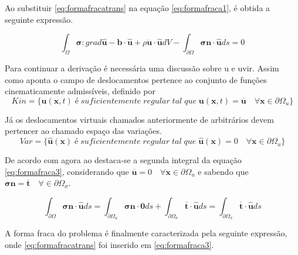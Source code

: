 Ao substituir \ref{eq:formafracatrans} na equação \ref{eq:formafraca1}, é obtida a seguinte expressão.

\begin{equation}
\int_{\Omega} \boldsymbol{\sigma} : grad \boldsymbol{\hat{u}} -  \boldsymbol{b} \cdot \boldsymbol{\hat{u}} + \rho\ddot{\boldsymbol{u}} \cdot \boldsymbol{\hat{u}} dV - \int_{\partial \Omega} \boldsymbol{\sigma n} \cdot \boldsymbol{\hat{u}} ds = 0
\label{eq:formafraca3}
\end{equation}

Para continuar a derivação é necessária uma discussão sobre \gls{u} e \gls{uvir}.  Assim como aponta \cite{Paulo} o campo de deslocamentos pertence ao conjunto de funções cinematicamente admissíveis, definido por 
\begin{equation}
	Kin = \{ \boldsymbol{u}(\boldsymbol{x},t) \; é \; suficientemente \; regular \; tal \; que \; \boldsymbol{u}(\boldsymbol{x},t) = \boldsymbol{\overline{u}}  \quad \forall \boldsymbol{x} \in \partial \Omega_u \}
\end{equation}

Já os deslocamentos virtuais chamados anteriormente de arbitrários devem pertencer ao chamado espaço das variações.
\begin{equation}
	Var  = \{ \boldsymbol{\hat{u}}(\boldsymbol{x}) \; é \; suficientemente \; regular \; tal \; que \; \boldsymbol{\hat{u}}(\boldsymbol{x}) = 0  \quad \forall \boldsymbol{x} \in \partial \Omega_u \}
\end{equation}


De acordo com \cite{Paulo} agora ao destaca-se a segunda integral da equação \ref{eq:formafraca3}, considerando que $ \boldsymbol{\overline{u}} = 0 \quad \forall \boldsymbol{x} \in \partial \Omega_u $ e sabendo que $ \boldsymbol{\sigma n} = \boldsymbol{\overline{t}} \quad \forall \in \partial \Omega_{\sigma} $.

\begin{equation} \label{eq:formafracatrans}
	\int_{\partial \Omega} \boldsymbol{\sigma n} \cdot \boldsymbol{\hat{u}} ds = \int_{\partial \Omega_u} \boldsymbol{\sigma n} \cdot \boldsymbol{0} ds + \int_{\partial \Omega_{\sigma}} \boldsymbol{\overline{t}} \cdot \boldsymbol{\hat{u}} ds = \int_{\partial \Omega_{\sigma}} \boldsymbol{\overline{t}} \cdot \boldsymbol{\hat{u}} ds 
\end{equation}

A forma fraca do problema é finalmente caracterizada pela seguinte expressão, onde \ref{eq:formafracatrans} foi inserido em \ref{eq:formafraca3}.

